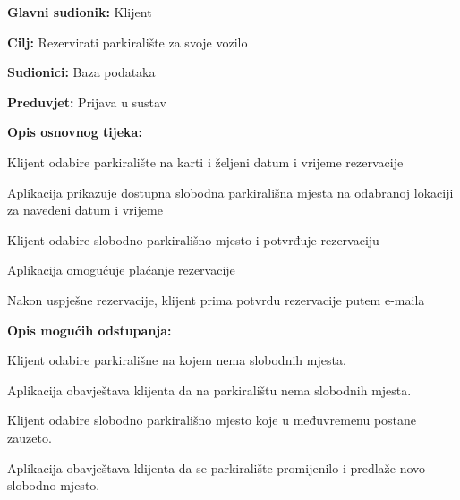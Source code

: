 \noindent {}
\begin{packed_item}
	
	\item \textbf{Glavni sudionik: }Klijent
	\item  \textbf{Cilj:} Rezervirati parkiralište za svoje vozilo
	\item  \textbf{Sudionici:} Baza podataka
	\item  \textbf{Preduvjet:} Prijava u sustav
	\item  \textbf{Opis osnovnog tijeka:}
	
	\item[] \begin{packed_enum}
		
		\item Klijent odabire parkiralište na karti i željeni datum i vrijeme rezervacije
		\item Aplikacija prikazuje dostupna slobodna parkirališna mjesta na odabranoj lokaciji za navedeni datum i vrijeme
		\item Klijent odabire slobodno parkirališno mjesto i potvrđuje rezervaciju
		\item Aplikacija omogućuje plaćanje rezervacije
		\item Nakon uspješne rezervacije, klijent prima potvrdu rezervacije putem e-maila
		
	\end{packed_enum}
	
	\item  \textbf{Opis mogućih odstupanja:}
	
	\item[] \begin{packed_item}
		
		\item[2.a] Klijent odabire parkirališne na kojem nema slobodnih mjesta.
		\item[] \begin{packed_enum}
			
			\item Aplikacija obavještava klijenta da na parkiralištu nema slobodnih mjesta.
			
		\end{packed_enum}
		
		\item[3.a] Klijent odabire slobodno parkirališno mjesto koje u međuvremenu postane zauzeto.
		\item[] \begin{packed_enum}
			
			\item Aplikacija obavještava klijenta da se parkiralište promijenilo i predlaže novo slobodno mjesto.
			
		\end{packed_enum}
		
	\end{packed_item}

\end{packed_item}

